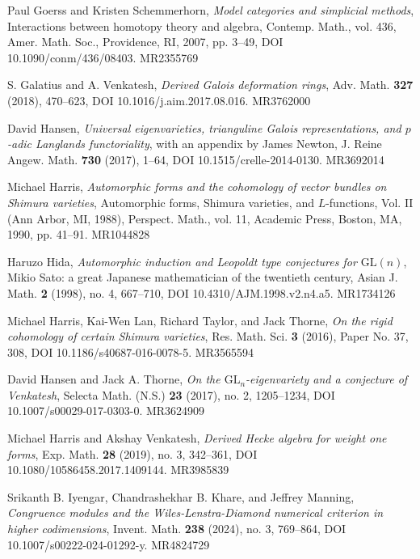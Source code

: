 \begin{refs}
\item[{[GS07]}] Paul Goerss and Kristen Schemmerhorn, \emph{Model categories and simplicial methods}, Interactions between homotopy theory and algebra, Contemp. Math., vol. 436, Amer. Math. Soc., Providence, RI, 2007, pp. 3--49, DOI 10.1090/conm/436/08403. MR2355769
\item[{[GV18]}] S. Galatius and A. Venkatesh, \emph{Derived Galois deformation rings}, Adv. Math. \textbf{327} (2018), 470--623, DOI 10.1016/j.aim.2017.08.016. MR3762000
\item[{[Han17]}] David Hansen, \emph{Universal eigenvarieties, trianguline Galois representations, and $p$-adic Langlands functoriality}, with an appendix by James Newton, J. Reine Angew. Math. \textbf{730} (2017), 1--64, DOI 10.1515/crelle-2014-0130. MR3692014
\item[{[Har90]}] Michael Harris, \emph{Automorphic forms and the cohomology of vector bundles on Shimura varieties}, Automorphic forms, Shimura varieties, and $L$-functions, Vol. II (Ann Arbor, MI, 1988), Perspect. Math., vol. 11, Academic Press, Boston, MA, 1990, pp. 41--91. MR1044828
\item[{[Hid98]}] Haruzo Hida, \emph{Automorphic induction and Leopoldt type conjectures for $\mathrm{GL}(n)$}, Mikio Sato: a great Japanese mathematician of the twentieth century, Asian J. Math. \textbf{2} (1998), no. 4, 667--710, DOI 10.4310/AJM.1998.v2.n4.a5. MR1734126
\item[{[HLTT16]}] Michael Harris, Kai-Wen Lan, Richard Taylor, and Jack Thorne, \emph{On the rigid cohomology of certain Shimura varieties}, Res. Math. Sci. \textbf{3} (2016), Paper No. 37, 308, DOI 10.1186/s40687-016-0078-5. MR3565594
\item[{[HT17]}] David Hansen and Jack A. Thorne, \emph{On the $\mathrm{GL}_n$-eigenvariety and a conjecture of Venkatesh}, Selecta Math. (N.S.) \textbf{23} (2017), no. 2, 1205--1234, DOI 10.1007/s00029-017-0303-0. MR3624909
\item[{[HV19]}] Michael Harris and Akshay Venkatesh, \emph{Derived Hecke algebra for weight one forms}, Exp. Math. \textbf{28} (2019), no. 3, 342--361, DOI 10.1080/10586458.2017.1409144. MR3985839
\item[{[IKM22]}] Srikanth B. Iyengar, Chandrashekhar B. Khare, and Jeffrey Manning, \emph{Congruence modules and the Wiles-Lenstra-Diamond numerical criterion in higher codimensions}, Invent. Math. \textbf{238} (2024), no. 3, 769--864, DOI 10.1007/s00222-024-01292-y. MR4824729


\end{refs}
